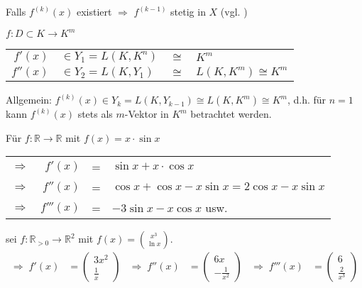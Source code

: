 \begin{underlinedenvironment}[Hinweis]
	Falls $f^(k)(x)$ existiert $\Rightarrow$ $f^{(k-1)}$ stetig in $X$  (vgl. )
\end{underlinedenvironment}
\begin{boldenvironment}[Speziafall $n=1$]
	$f:D\subset K\to K^m$\\
	\begin{tabularx}{\linewidth}{r@{$\;$}l@{$\,$}c@{$\,$}X}
	$f'(x)$ & $\in Y_1 = L(K, K^n)$ & $\cong$ & $K^m$ \\
	$f''(x)$ & $\in Y_2 = L(K, Y_1)$ & $\cong$ &  $L(K, K^m)\cong K^m$
	\end{tabularx}
	Allgemein: $f^{(k)}(x) \in Y_k = L(K, Y_{k-1}) \cong L(K, K^m)\cong K^m$, d.h. für $n=1$ kann $f^{(k)}(x)$ stets als $m$-Vektor in $K^m$ betrachtet werden.
\end{boldenvironment}

\begin{example}
	Für $f:\mathbb{R}\to\mathbb{R}$ mit $f(x) = x\cdot \sin x$\\ \begin{tabularx}{\linewidth}{r@{\ \ }r@{\ }c@{\ }l}
		$\Rightarrow$ & $f'(x)$ & = & $\sin x + x\cdot \cos x $ \\
		$\Rightarrow$ & $f''(x)$ & = & $\cos x + \cos x - x \sin x = 2 \cos x - x \sin x$ \\
		$\Rightarrow$ & $f'''(x)$ & = & $-3\sin x - x\cos x$ usw.
	\end{tabularx}
	\begin{center}\end{center}
\end{example}

\begin{example}
	sei $f:\mathbb{R}_{> 0}\to\mathbb{R}^2$ mit $f(x) = \binom{x^3}{\ln x}$. \begin{align*}
		\Rightarrow\;f'(x) &= \begin{pmatrix}
			3x^2 \\ \frac{1}{x}
		\end{pmatrix} & \Rightarrow\; f''(x) &= \begin{pmatrix}
			6x \\ -\frac{1}{x^2}
		\end{pmatrix} & \Rightarrow\; f'''(x) &= \begin{pmatrix}
			6 \\ \frac{2}{x^3}
		\end{pmatrix}
	\end{align*}
\end{example}

